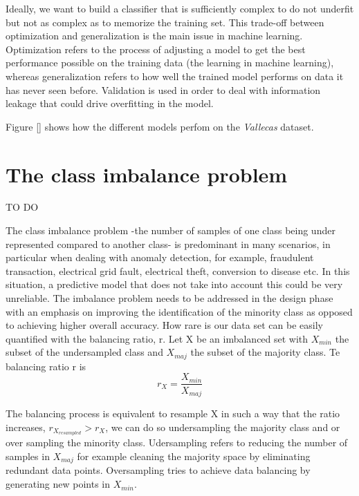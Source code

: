 \documentclass[11pt]{article}
\theoremstyle{definition}
\theoremstyle{remark}
\begin{document}
Ideally, we want to build a classifier that is sufficiently complex to do not underfit but not as complex as to memorize the training set. This trade-off between optimization and generalization is the main issue in machine learning. Optimization refers to the process of adjusting a model to get the best performance possible on the training data (the learning in machine learning), whereas generalization refers to how well the trained model performs on data it has never seen before. Validation is used in order to deal with information leakage that could drive overfitting in the model.

Figure \ref{} shows how the different models perfom on the \emph{Vallecas} dataset.



\section{The class imbalance problem}
\label{se:imbalance}

TO DO



The class imbalance problem -the number of samples of one class being under represented compared to another class- is predominant in many scenarios, in particular when dealing with anomaly detection, for example, fraudulent transaction, electrical grid fault, electrical theft, conversion to disease  etc. In this situation, a predictive model that does not take into account this could be very unreliable.
The imbalance problem needs to be addressed in the design phase with an emphasis on improving the identification of the minority class as opposed to achieving higher overall accuracy.
How rare is our data set can be easily quantified with the balancing ratio, r. Let X be an imbalanced set with $X_{min}$ the subset of the undersampled class and $X_{maj}$ the subset of the majority class. Te balancing ratio r is
\begin{equation}
r_X = \frac{X_{min}}{X_{maj}}
\end{equation}

The balancing process is equivalent to resample X in such a way that the ratio increases, $r_{X_{resampled}} > r_X$, we can do so undersampling the majority class and or over sampling the minority class. Udersampling refers to reducing the number of samples in $X_{maj}$ for example cleaning the majority space by eliminating redundant data points. Oversampling tries to achieve data balancing by generating new points in $X_{min}$.
\end{document}
